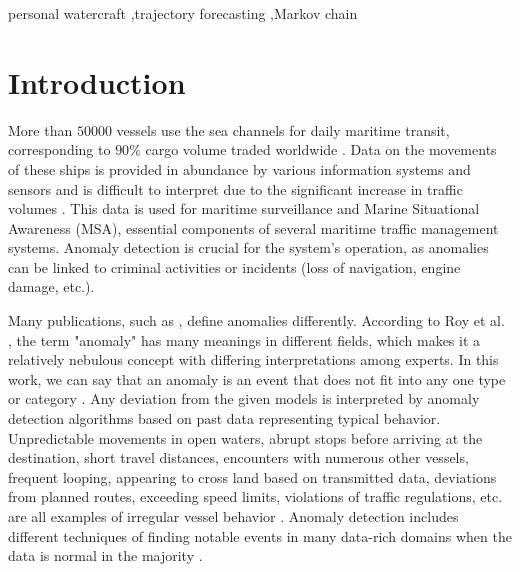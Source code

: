\documentclass[preprint,12pt]{elsarticle}
\begin{document}
\begin{frontmatter}
\begin{keyword}
personal watercraft \sep trajectory forecasting \sep Markov chain 
\end{keyword}

\end{frontmatter}



\section{Introduction}
More than $50000$ vessels use the sea channels for daily maritime transit, corresponding to $90\%$ cargo volume traded worldwide \citep{2022Kim}. Data on the movements of these ships is provided in abundance by various information systems and sensors and is difficult to interpret due to the significant increase in traffic volumes \citep{2013Kazemi}. This data is used for maritime surveillance and Marine Situational Awareness (MSA), essential components of several maritime traffic management systems. Anomaly detection is crucial for the system's operation, as anomalies can be linked to criminal activities or incidents (loss of navigation, engine damage, etc.).

Many publications, such as \citep{2009Chandola, 2011Martineau}, define anomalies differently. According to Roy et al. \citep{2008Roy}, the term "anomaly" has many meanings in different fields, which makes it a relatively nebulous concept with differing interpretations among experts. In this work, we can say that an anomaly is an event that does not fit into any one type or category \citep{2009Chandola}. Any deviation from the given models is interpreted by anomaly detection algorithms based on past data representing typical behavior. Unpredictable movements in open waters, abrupt stops before arriving at the destination, short travel distances, encounters with numerous other vessels, frequent looping, appearing to cross land based on transmitted data, deviations from planned routes, exceeding speed limits, violations of traffic regulations, etc. are all examples of irregular vessel behavior \citep{2014Mascaro, 2008Laxhammar}. Anomaly detection includes different techniques of finding notable events in many data-rich domains when the data is normal in the majority \citep{2009Chandola}.
\end{document}
